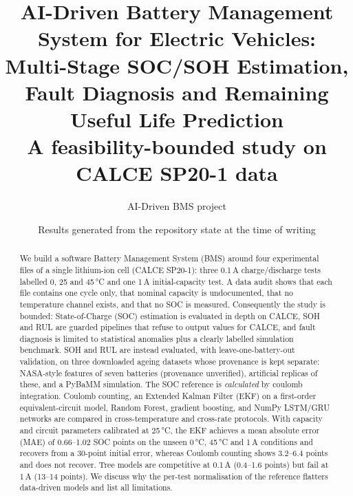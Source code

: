 \documentclass[11pt,a4paper]{article}
\title{AI-Driven Battery Management System for Electric Vehicles:\\ Multi-Stage SOC/SOH Estimation, Fault Diagnosis and Remaining Useful Life Prediction\\[4pt]\large A feasibility-bounded study on CALCE SP20-1 data}
\author{AI-Driven BMS project}
\date{Results generated from the repository state at the time of writing}
\begin{document}
\maketitle
\begin{abstract}
We build a software Battery Management System (BMS) around four experimental files of a single lithium-ion cell (CALCE SP20-1): three 0.1\,A charge/discharge tests labelled 0, 25 and 45\,°C and one 1\,A initial-capacity test. A data audit shows that each file contains one cycle only, that nominal capacity is undocumented, that no temperature channel exists, and that no SOC is measured. Consequently the study is bounded: State-of-Charge (SOC) estimation is evaluated in depth on CALCE, SOH and RUL are guarded pipelines that refuse to output values for CALCE, and fault diagnosis is limited to statistical anomalies plus a clearly labelled simulation benchmark. SOH and RUL are instead evaluated, with leave-one-battery-out validation, on three downloaded ageing datasets whose provenance is kept separate: NASA-style features of seven batteries (provenance unverified), artificial replicas of these, and a PyBaMM simulation. The SOC reference is \emph{calculated} by coulomb integration. Coulomb counting, an Extended Kalman Filter (EKF) on a first-order equivalent-circuit model, Random Forest, gradient boosting, and NumPy LSTM/GRU networks are compared in cross-temperature and cross-rate protocols. With capacity and circuit parameters calibrated at 25\,°C, the EKF achieves a mean absolute error (MAE) of 0.66--1.02 SOC points on the unseen 0\,°C, 45\,°C and 1\,A conditions and recovers from a 30-point initial error, whereas Coulomb counting shows 3.2--6.4 points and does not recover. Tree models are competitive at 0.1\,A (0.4--1.6 points) but fail at 1\,A (13--14 points). We discuss why the per-test normalisation of the reference flatters data-driven models and list all limitations.
\end{abstract}
\tableofcontents










\appendix

\end{document}
